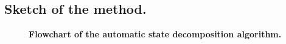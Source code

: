 \subsection{Sketch of the method.}
\label{section:methods:sketch}

\begin{figure}[tb]
  \begin{center}
  \end{center}
  \caption{{\bf Flowchart of the automatic state decomposition algorithm.}}
  \label{figure:methods-flowchart}
\end{figure}

